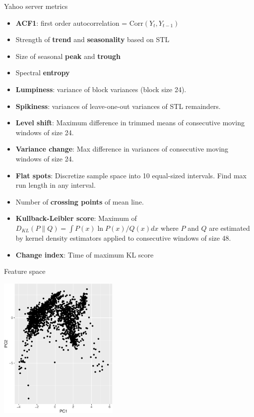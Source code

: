 \documentclass[14pt,ignorenonframetext,]{beamer}
\providecommand{\tightlist}{%
  \setlength{\itemsep}{0pt}\setlength{\parskip}{0pt}}
\begin{document}
\begin{frame}{Yahoo server metrics}
\protect\hypertarget{yahoo-server-metrics-2}{}

\fontsize{11}{11.8}\sf\vspace*{-0.2cm}

\begin{itemize}
\tightlist
\item
  \textbf{ACF1}: first order autocorrelation =
  \(\text{Corr}(Y_t,Y_{t-1})\)
\item
  Strength of \textbf{trend} and \textbf{seasonality} based on STL
\item
  Size of seasonal \textbf{peak} and \textbf{trough}
\item
  Spectral \textbf{entropy}
\item
  \textbf{Lumpiness}: variance of block variances (block size 24).
\item
  \textbf{Spikiness}: variances of leave-one-out variances of STL
  remainders.
\item
  \textbf{Level shift}: Maximum difference in trimmed means of
  consecutive moving windows of size 24.
\item
  \textbf{Variance change}: Max difference in variances of consecutive
  moving windows of size 24.
\item
  \textbf{Flat spots}: Discretize sample space into 10 equal-sized
  intervals. Find max run length in any interval.
\item
  Number of \textbf{crossing points} of mean line.
\item
  \textbf{Kullback-Leibler score}: Maximum of
  \(D_{KL}(P\|Q) = \int P(x)\ln P(x)/ Q(x) dx\) where \(P\) and \(Q\)
  are estimated by kernel density estimators applied to consecutive
  windows of size 48.
\item
  \textbf{Change index}: Time of maximum KL score
\end{itemize}

\end{frame}

\begin{frame}{Feature space}
\protect\hypertarget{feature-space}{}

\fontsize{11}{11}\sf

\vspace*{-0.2cm}

\includegraphics[width=5.8cm]{YahooFeatureSpace}

\end{frame}
\end{document}
